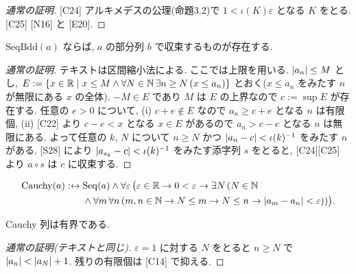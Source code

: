 \begin{lem}\end{lem}
\begin{proof}[通常の証明]
  [C24] アルキメデスの公理(命題3.2)で $1 < \iota(K)\varepsilon$ となる $K$ をとる. [C25] [N16] と [E20].
\end{proof}

\begin{thm}\label{thm:bw}
  $\mathrm{SeqBdd}(a)$ ならば, $a$ の部分列 $b$ で収束するものが存在する.
\end{thm}
\begin{proof}[通常の証明]
  テキストは区間縮小法による. ここでは上限を用いる. $\lvert a_n\rvert \leq M$ とし, $E := \{x \in \mathbb{R} \mid x \leq M \land \forall N \in \mathbb{N}\,\exists n \geq N\,(x \leq a_n)\}$ とおく($x \leq a_n$ をみたす $n$ が無限にある $x$ の全体). $-M \in E$ であり $M$ は $E$ の上界なので $c := \sup E$ が存在する. 任意の $e > 0$ について, (i) $c + e \notin E$ なので $a_n \geq c + e$ となる $n$ は有限個, (ii) [C22] より $c - e < x$ となる $x \in E$ があるので $a_n > c - e$ となる $n$ は無限にある. よって任意の $k$, $N$ について $n \geq N$ かつ $\lvert a_n - c\rvert < \iota(k)^{-1}$ をみたす $n$ がある. [S28] により $\lvert a_{s_k} - c\rvert < \iota(k)^{-1}$ をみたす添字列 $s$ をとると, [C24][C25] より $a \circ s$ は $c$ に収束する.
\end{proof}

\begin{dfn}
  \begin{align*}
    \mathrm{Cauchy}(a) :\leftrightarrow{}& \mathrm{Seq}(a) \land \forall\varepsilon\,\bigl(\varepsilon \in \mathbb{R} \to 0 < \varepsilon \to \exists N\,(N \in \mathbb{N} \\
    & \land \forall m\,\forall n\,(m, n \in \mathbb{N} \to N \leq m \to N \leq n \to \lvert a_m - a_n\rvert < \varepsilon))\bigr).
  \end{align*}
\end{dfn}

\begin{lem}\end{lem}

\begin{lem}
  Cauchy 列は有界である.
\end{lem}
\begin{proof}[通常の証明(テキストと同じ)]
  $\varepsilon = 1$ に対する $N$ をとると $n \geq N$ で $\lvert a_n\rvert < \lvert a_N\rvert + 1$. 残りの有限個は [C14] で抑える.
\end{proof}

